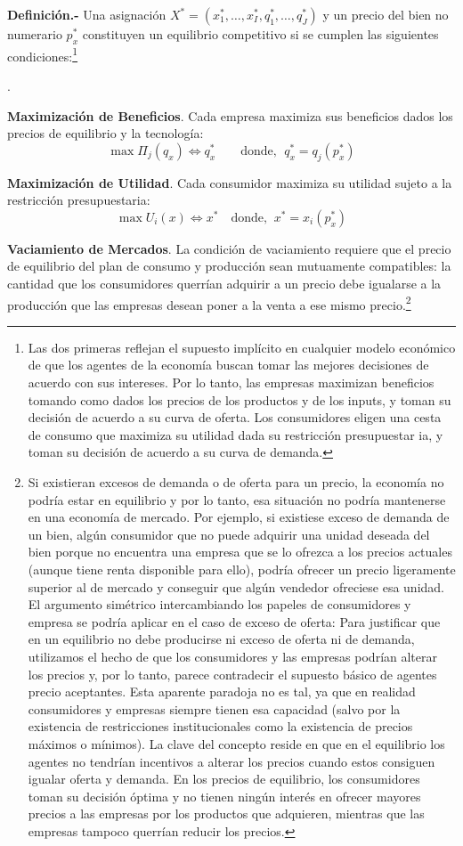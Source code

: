 \documentclass[10pt,a4paper]{article}
\newcounter{numitem}
\newenvironment{lnum}
      {\begin{list}{\arabic{numitem}.}{%
          \usecounter{numitem}%
          \setlength{\leftmargin}{1cm}%
          \setlength{\parskip}{3pt}%
          \setlength{\itemsep}{0pt}%
          \setlength{\parsep}{0pt}%
      }}
      {\end{list}}
\begin{document}
\textbf{Definición.-} Una asignación $X^*=(x_1^*,\dots,x_I^*,q_1^*,\dots,q_J^*)$ y un precio del bien no numerario $p_x^*$ constituyen un equilibrio competitivo si se cumplen las siguientes condiciones:\footnote{%
    Las dos primeras reflejan el supuesto implícito en cualquier modelo económico de que los agentes de la economía buscan tomar las mejores decisiones de acuerdo con sus intereses. Por lo tanto, las empresas maximizan beneficios tomando como dados los precios de los productos y de los inputs, y toman su decisión de acuerdo a su curva de oferta. Los consumidores eligen una cesta de consumo que maximiza su utilidad dada su restricción presupuestar ia, y toman su decisión de acuerdo a su curva de demanda.
}
\begin{lnum}
    \item \textbf{Maximización de Beneficios}. Cada empresa maximiza sus beneficios dados los precios de equilibrio y la tecnología: 
    $$\max \Pi_j(q_x)\iff q_x^*\qquad \text{donde, }\;q_x^*=q_j(p_x^*)$$
    \item \textbf{Maximización de Utilidad}. Cada consumidor maximiza su utilidad sujeto a la restricción presupuestaria:
    $$\max U_i(x)\iff x^*\quad \text{donde,}\;\;x^*=x_i(p_x^*)$$
    \item \textbf{Vaciamiento de Mercados}. La condición de vaciamiento requiere que el precio de equilibrio del plan de consumo y producción sean mutuamente compatibles: la cantidad que los consumidores querrían adquirir a un precio debe igualarse a la producción que las empresas desean poner a la venta a ese mismo precio.\footnote{%
        Si existieran excesos de demanda o de oferta para un precio, la economía no podría estar en equilibrio y por lo tanto, esa situación no podría mantenerse en una economía de mercado. Por ejemplo, si existiese exceso de demanda de un bien, algún consumidor que no puede adquirir una unidad deseada del bien porque no encuentra una empresa que se lo ofrezca a los precios actuales (aunque tiene renta disponible para ello), podría ofrecer un precio ligeramente superior al de mercado y conseguir que algún vendedor ofreciese esa unidad. El argumento simétrico intercambiando los papeles de consumidores y empresa se podría aplicar en el caso de exceso de oferta: Para justificar que en un equilibrio no debe producirse ni exceso de oferta ni de demanda, utilizamos el hecho de que los consumidores y las empresas podrían alterar los precios y, por lo tanto, parece contradecir el supuesto básico de agentes precio aceptantes. Esta aparente paradoja no es tal, ya que en realidad consumidores y empresas siempre tienen esa capacidad (salvo por la existencia de restricciones institucionales como la existencia de precios máximos o mínimos).  La clave del concepto reside en que en el equilibrio los agentes no tendrían incentivos a alterar los precios cuando estos consiguen igualar oferta y demanda. En los precios de equilibrio, los consumidores toman su decisión óptima y no tienen ningún interés en ofrecer mayores precios a las empresas por los productos que adquieren, mientras que las empresas tampoco querrían reducir los precios.
}
\end{lnum}
\end{document}

